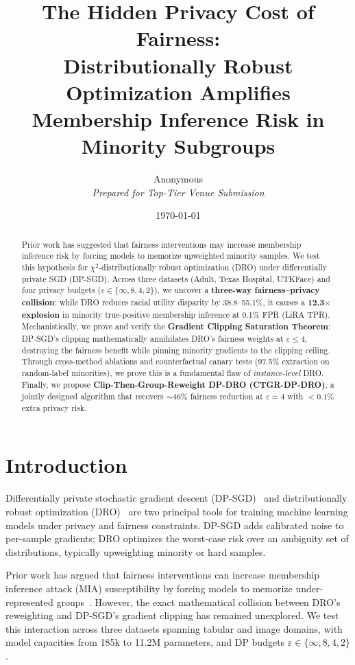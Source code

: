 \documentclass[11pt, a4paper]{article}
\title{The Hidden Privacy Cost of Fairness: \\ Distributionally Robust Optimization Amplifies Membership Inference Risk in Minority Subgroups}
\author{Anonymous \\ \textit{Prepared for Top-Tier Venue Submission}}
\date{\today}
\begin{document}
\maketitle

\begin{abstract}
Prior work has suggested that fairness interventions may increase membership inference risk by forcing models to memorize upweighted minority samples. We test this hypothesis for $\chi^2$-distributionally robust optimization (DRO) under differentially private SGD (DP-SGD). Across three datasets (Adult, Texas Hospital, UTKFace) and four privacy budgets ($\varepsilon \in \{\infty, 8, 4, 2\}$), we uncover a \textbf{three-way fairness--privacy collision}: while DRO reduces racial utility disparity by 38.8--55.1\%, it causes a \textbf{12.3$\times$ explosion} in minority true-positive membership inference at 0.1\% FPR (LiRA TPR). Mechanistically, we prove and verify the \textbf{Gradient Clipping Saturation Theorem}: DP-SGD's clipping mathematically annihilates DRO's fairness weights at $\varepsilon \le 4$, destroying the fairness benefit while pinning minority gradients to the clipping ceiling. Through cross-method ablations and counterfactual canary tests (97.5\% extraction on random-label minorities), we prove this is a fundamental flaw of \textit{instance-level} DRO. Finally, we propose \textbf{Clip-Then-Group-Reweight DP-DRO (CTGR-DP-DRO)}, a jointly designed algorithm that recovers $\sim$46\% fairness reduction at $\varepsilon=4$ with $<0.1\%$ extra privacy risk.
\end{abstract}

\section{Introduction}
Differentially private stochastic gradient descent (DP-SGD)~\cite{abadi2016} and distributionally robust optimization (DRO)~\cite{duchi2021, hashimoto2018} are two principal tools for training machine learning models under privacy and fairness constraints. DP-SGD adds calibrated noise to per-sample gradients; DRO optimizes the worst-case risk over an ambiguity set of distributions, typically upweighting minority or hard samples.

Prior work has argued that fairness interventions can increase membership inference attack (MIA) susceptibility by forcing models to memorize under-represented groups~\cite{shokri2021, song2019}. However, the exact mathematical collision between DRO's reweighting and DP-SGD's gradient clipping has remained unexplored. We test this interaction across three datasets spanning tabular and image domains, with model capacities from 185k to 11.2M parameters, and DP budgets $\varepsilon\in\{\infty,8,4,2\}$.
\end{document}
